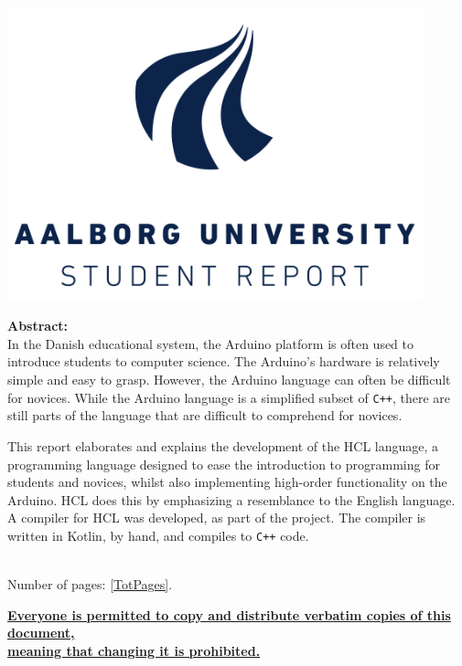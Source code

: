 \begin{minipage}[T]{0.45\textwidth}
 \begin{flushright}
  \includegraphics[width=0.9\textwidth]{images/aau_logo.pdf}\\[1.0 cm]
 \end{flushright}
 \begin{flushleft}
  \textbf{Abstract:}\\
  In the Danish educational system, the Arduino platform is often used to introduce students to computer science.
  The Arduino's hardware is relatively simple and easy to grasp.
  However, the Arduino language can often be difficult for novices.
  While the Arduino language is a simplified subset of \texttt{C++}, there are still parts of the language that are difficult to comprehend for novices.

  This report elaborates and explains the development of the HCL language, a programming language designed to ease the introduction to programming for students and novices, whilst also implementing high-order functionality on the Arduino.
  HCL does this by emphasizing a resemblance to the English language.
  A compiler for HCL was developed, as part of the project.
  The compiler is written in Kotlin, by hand, and compiles to \texttt{C++} code.


 \end{flushleft}
\end{minipage}\\
Number of pages: \ref{TotPages}.\\
\begin{center}
 \begin{scriptsize}
  \textbf{\underline{Everyone is permitted to copy and distribute verbatim copies of this document,}}\\ \textbf{\underline{ meaning that changing it is prohibited.}}
 \end{scriptsize}
\end{center}
